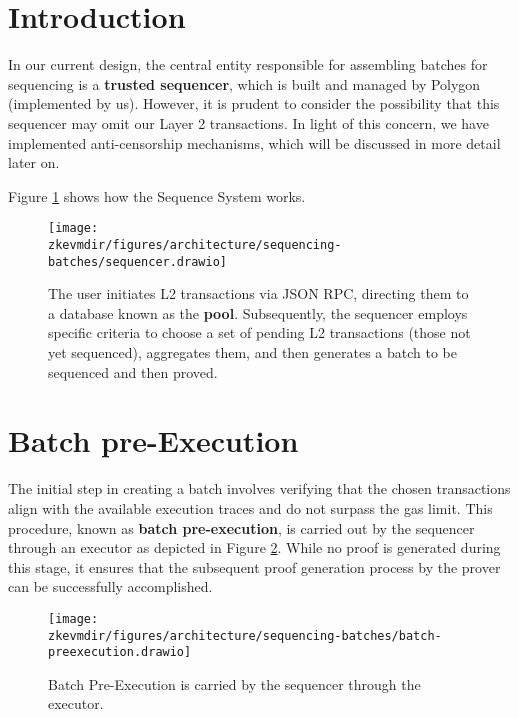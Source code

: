 


\section{Introduction}

In our current design, the central entity responsible for assembling batches for sequencing is a \textbf{trusted sequencer}, which is built and managed by Polygon (implemented by us). However, it is prudent to consider the possibility that this sequencer may omit our Layer 2 transactions. In light of this concern, we have implemented anti-censorship mechanisms, which will be discussed in more detail later on.

Figure \ref{fig:seq-system} shows how the Sequence System works.

\begin{figure}[H]
\centering
\texttt{[image: \\zkevmdir/figures/architecture/sequencing-batches/sequencer.drawio]}
\caption{The user initiates L2 transactions via JSON RPC, directing them to a database known as the \textbf{pool}. Subsequently, the sequencer employs specific criteria to choose a set of pending L2 transactions (those not yet sequenced), aggregates them, and then generates a batch to be sequenced and then proved.}
\label{fig:seq-system}
\end{figure} 




\section {Batch pre-Execution}


The initial step in creating a batch involves verifying that the chosen transactions align with the available execution traces and do not surpass the gas limit. This procedure, known as \textbf{batch pre-execution}, is carried out by the sequencer through an executor as depicted in Figure \ref{fig:batch-pre-ex}. While no proof is generated during this stage, it ensures that the subsequent proof generation process by the prover can be successfully accomplished.

\begin{figure}[H]
\centering
\texttt{[image: \\zkevmdir/figures/architecture/sequencing-batches/batch-preexecution.drawio]}
\caption{Batch Pre-Execution is carried by the sequencer through the executor.}
\label{fig:batch-pre-ex}
\end{figure} 


